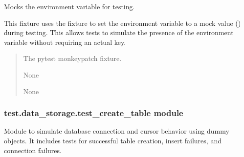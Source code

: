 \documentclass[letterpaper,10pt,english]{sphinxmanual}
\begin{document}

\begin{fulllineitems}
\label{\detokenize{test.data_storage:test.data_storage.conftest.monkeypatch_env}}
\pysigstartsignatures
\pysiglinewithargsret
{}
{}
{}
\pysigstopsignatures
\sphinxAtStartPar
Mocks the  environment variable for testing.

\sphinxAtStartPar
This fixture uses the  fixture to set the environment variable 
to a mock value () during testing. This allows tests to simulate the presence
of the environment variable without requiring an actual key.
\begin{quote}\begin{description}
\sphinxAtStartPar
{} \textendash{} The pytest monkeypatch fixture.

\sphinxAtStartPar
None

\sphinxAtStartPar
None

\end{description}\end{quote}

\end{fulllineitems}



\subsubsection{test.data\_storage.test\_create\_table module}
\label{\detokenize{test.data_storage:module-test.data_storage.test_create_table}}\label{\detokenize{test.data_storage:test-data-storage-test-create-table-module}}
\sphinxAtStartPar
Module to simulate database connection and cursor behavior using dummy objects.
It includes tests for successful table creation, insert failures, and connection failures.
\end{document}

